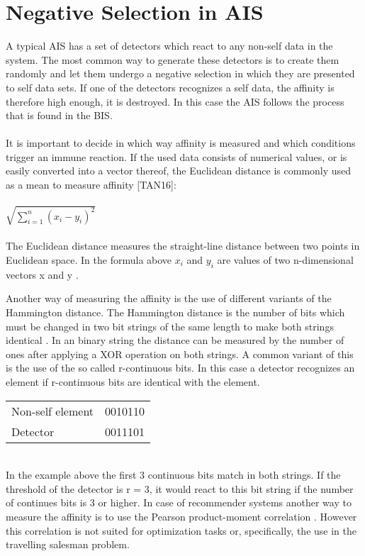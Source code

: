 \section{Negative Selection in AIS}

A typical AIS has a set of detectors which react to any non-self data in the system. The most common way to generate these detectors is to create them randomly and let them undergo a negative selection in which they are presented to self data sets. If one of the detectors recognizes a self data, the affinity is therefore high enough, it is destroyed. In this case the AIS follows the process that is found in the BIS.\\\\ 
It is important to decide in which way affinity is measured and which conditions trigger an immune reaction. If the used data consists of numerical values, or is easily converted into a vector thereof, the Euclidean distance \cite{howard} is commonly used as a mean to measure affinity [TAN16]:\\\\
\begin{math}
\sqrt{\sum_{i=1}^{n}(x_{i}-y_{i})^2}
\end{math}\\\\
The Euclidean distance measures the straight-line distance between two points in Euclidean space. In the formula above \begin{math}x_{i}\end{math} and \begin{math}y_{i}\end{math} are values of two n-dimensional vectors x and y \cite{howard}.  

Another way of measuring the affinity is the use of different variants of the Hammington distance. The Hammington distance is the number of bits which must be changed in two bit strings of the same length to make both strings identical \cite{hammington}. In an binary string the distance can be measured by the number of ones after applying a XOR operation on both strings. A common variant of this is the use of the so called r-continuous bits. In this case a detector recognizes an element if r-continuous bits are identical with the element.\\
\begin{table*}[htbp]
	\begin{tabular}{ll}
Non-self element & 0010110\\
Detector & 0011101
	\end{tabular}
\end{table*}\\
In the example above the first 3 continuous bits match in both strings. If the threshold of the detector is r = 3, it would react to this bit string if the number of continues bits is 3 or higher.
In case of recommender systems another way to measure the affinity is to use the Pearson product-moment correlation \cite{pearson}. However this correlation is not suited for optimization tasks or, specifically, the use in the travelling salesman problem. 
